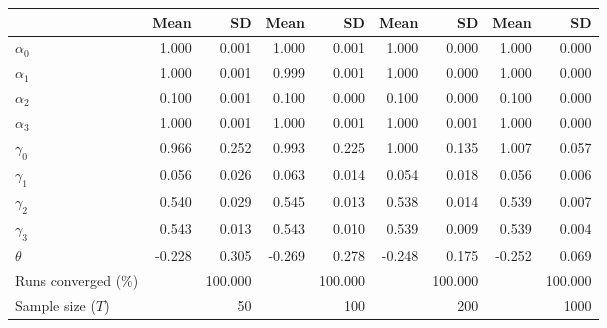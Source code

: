 
\begin{tabular}[t]{lrrrrrrrr}
\toprule
  & Mean & SD & Mean  & SD  & Mean   & SD   & Mean    & SD   \\
\midrule
$\alpha_{0}$ & 1.000 & 0.001 & 1.000 & 0.001 & 1.000 & 0.000 & 1.000 & 0.000\\
$\alpha_{1}$ & 1.000 & 0.001 & 0.999 & 0.001 & 1.000 & 0.000 & 1.000 & 0.000\\
$\alpha_{2}$ & 0.100 & 0.001 & 0.100 & 0.000 & 0.100 & 0.000 & 0.100 & 0.000\\
$\alpha_{3}$ & 1.000 & 0.001 & 1.000 & 0.001 & 1.000 & 0.001 & 1.000 & 0.000\\
$\gamma_{0}$ & 0.966 & 0.252 & 0.993 & 0.225 & 1.000 & 0.135 & 1.007 & 0.057\\
$\gamma_{1}$ & 0.056 & 0.026 & 0.063 & 0.014 & 0.054 & 0.018 & 0.056 & 0.006\\
$\gamma_{2}$ & 0.540 & 0.029 & 0.545 & 0.013 & 0.538 & 0.014 & 0.539 & 0.007\\
$\gamma_{3}$ & 0.543 & 0.013 & 0.543 & 0.010 & 0.539 & 0.009 & 0.539 & 0.004\\
$\theta$ & -0.228 & 0.305 & -0.269 & 0.278 & -0.248 & 0.175 & -0.252 & 0.069\\
Runs converged (\%) &  & 100.000 &  & 100.000 &  & 100.000 &  & 100.000\\
Sample size ($T$) &  & 50 &  & 100 &  & 200 &  & 1000\\
\bottomrule
\end{tabular}
